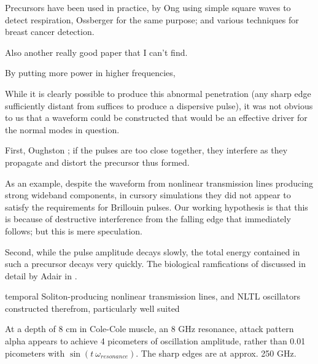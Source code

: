 \documentclass[paper.tex]{subfiles}
\begin{document}
Precursors have been used in practice, by Ong \cite{Detection2003} using simple square waves to detect respiration\footnotemark, Ossberger \cite{Noninvasive2004} for the same purpose; and various techniques for breast cancer detection. 


Also another really good paper that I can't find.


By putting more power in higher frequencies, 


While it is clearly possible to produce this abnormal penetration (any sharp edge sufficiently distant from  suffices to produce a dispersive pulse), it was not obvious to us that a waveform 
could be constructed that would be an effective driver for the normal modes in question. 

First, Oughston ; if the pulses are too close together, they interfere as they propagate and distort the precursor thus formed.

As an example, despite the waveform from nonlinear transmission lines producing strong wideband components, in cursory simulations they did not appear to satisfy the requirements for Brillouin pulses. Our working hypothesis is that this is because of destructive interference from the falling edge that immediately follows; but this is mere speculation.



Second, while the pulse amplitude decays slowly, the total energy contained in such a precursor decays very quickly. The biological ramfications of discussed in detail by Adair in \cite{Biophysics2000}.



temporal Soliton-producing nonlinear transmission lines, and NLTL oscillators constructed therefrom, particularly well suited 







At a depth of 8 cm in Cole-Cole muscle, an 8 GHz resonance, attack pattern alpha appears to achieve 4 picometers of oscillation amplitude, rather than 0.01 picometers with $\sin(t\ \omega_{resonance})$. The sharp edges are at approx. 250 GHz. 
\end{document}
